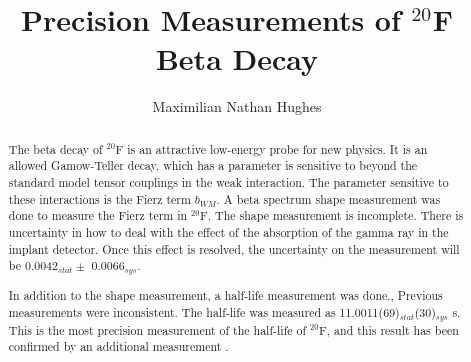 \documentclass{msuphddissertation}
\author{Maximilian Nathan Hughes} %
\title{Precision Measurements of $^{20}$F Beta Decay} %
\begin{document}
\maketitlepage %


\begin{abstract}
The beta decay of $^{20}$F is an attractive low-energy probe for new physics.
It is an allowed Gamow-Teller decay, which has a parameter is sensitive to beyond the standard model tensor couplings in the weak interaction.
The parameter sensitive to these interactions is the Fierz term $b_{WM}$.
A beta spectrum shape measurement was done to measure the Fierz term in $^{20}$F.
The shape measurement is incomplete.
There is uncertainty in how to deal with the effect of the absorption of the gamma ray in the implant detector.
Once this effect is resolved, the uncertainty on the measurement will be 0.0042$_{stat} \pm$ 0.0066$_{sys}$.

In addition to the shape measurement,  a half-life measurement was done., 
Previous measurements were inconsistent. 
The half-life was measured as 11.0011(69)$_{stat}$(30)$_{sys}$ s.
This is the most precision measurement of the half-life of $^{20}$F, and this result has been confirmed by an additional measurement \cite{Bur19}.

\end{abstract}




\end{document}
